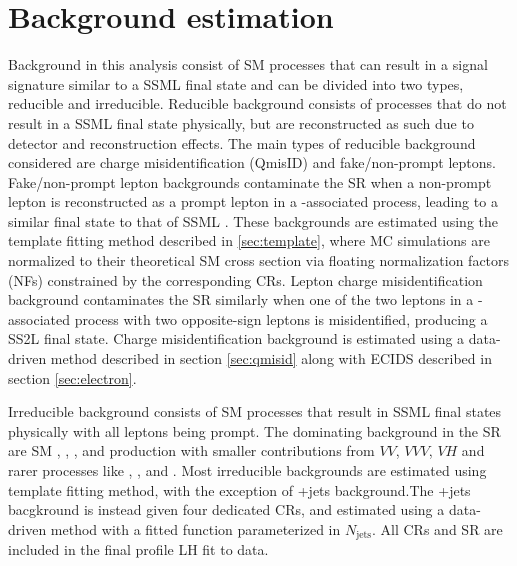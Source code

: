 \documentclass[../thesis.tex]{subfiles}
\begin{document}
\section{Background estimation}
\label{sec:bg}
Background in this analysis consist of \acs{SM} processes that can result in a signal signature similar to a \tttt \acs{SSML} final state and can be divided into two types, reducible and irreducible. Reducible background consists of processes that do not result in a \acs{SSML} final state physically, but are reconstructed as such due to detector and reconstruction effects. The main types of reducible background considered are charge misidentification (\acs{QmisID}) and fake/non-prompt leptons. Fake/non-prompt lepton backgrounds contaminate the \acs{SR} when a non-prompt lepton is reconstructed as a prompt lepton in a \ttbar-associated process, leading to a similar final state to that of \acs{SSML} \tttt. These backgrounds are estimated using the template fitting method described in \autoref{sec:template}, where \acs{MC} simulations are normalized to their theoretical \acs{SM} cross section via floating normalization factors (\acs{NF}s) constrained by the corresponding \acs{CR}s. Lepton charge misidentification background contaminates the \acs{SR} similarly when one of the two leptons in a \ttbar-associated process with two opposite-sign leptons is misidentified, producing a \acs{SS2L} \tttt final state. Charge misidentification background is estimated using a data-driven method described in section \ref{sec:qmisid} along with \acs{ECIDS} described in section \ref{sec:electron}.

Irreducible background consists of \acs{SM} processes that result in \acs{SSML} final states physically with all leptons being prompt. The dominating background in the \acs{SR} are \acs{SM} \tttt, \ttW, \ttZ, and \ttH production with smaller contributions from $VV$, $VVV$, $VH$ and rarer processes like \ttVV, \tWZ, \tZq and \ttt. Most irreducible backgrounds are estimated using template fitting method, with the exception of \ttW+jets background.The \ttW+jets bacgkround is instead given four dedicated \acs{CR}s, and estimated using a data-driven method with a fitted function parameterized in $N_\mathrm{jets}$. All \acs{CR}s and \acs{SR} are included in the final profile \acs{LH} fit to data.
\end{document}
